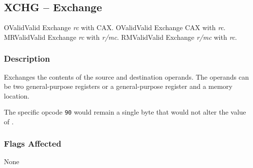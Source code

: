 \clearpage
{}
{}
\subsection*{XCHG -- Exchange}

\begin{x86opcodetable}
  {O}{Valid}{Valid}
  {Exchange \emph{rc} with CAX.}
  {O}{Valid}{Valid}
  {Exchange CAX with \emph{rc}.}
  {MR}{Valid}{Valid}
  {Exchange \emph{rc} with \emph{r/mc}.}
  {RM}{Valid}{Valid}
  {Exchange \emph{r/mc} with \emph{rc}.}
\end{x86opcodetable}

\begin{x86opentable}
\end{x86opentable}

\subsubsection*{Description}

Exchanges the contents of the source and destination operands.  The
operands can be two general-purpose registers or a general-purpose
register and a memory location.

The specific opcode \texttt{90} would remain a single byte
 that would not alter the value of \CAX{}.

\subsubsection*{Flags Affected}

None
